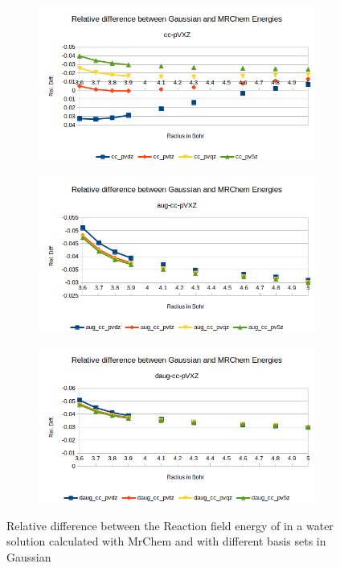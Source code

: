 \documentclass[../master_thesis.tex]{subfiles}
\begin{document}
\begin{figure}[h!]
  \centering
  \begin{subfigure}[b]{\linewidth}
    \includegraphics[width=\linewidth]{img/cyanreldiff.png}
  \end{subfigure}
  \begin{subfigure}[b]{\linewidth}
    \includegraphics[width=\linewidth]{img/cyanaugreldiff.png}
  \end{subfigure}
  \begin{subfigure}[b]{\linewidth}
    \includegraphics[width=\linewidth]{img/cyandaugreldiff.png}
  \end{subfigure}
  \caption{Relative difference between the Reaction field energy of  in a water solution calculated with MrChem
  and with different basis sets in Gaussian}
  \label{fig:cyanreldiff}
\end{figure}
\end{document}
